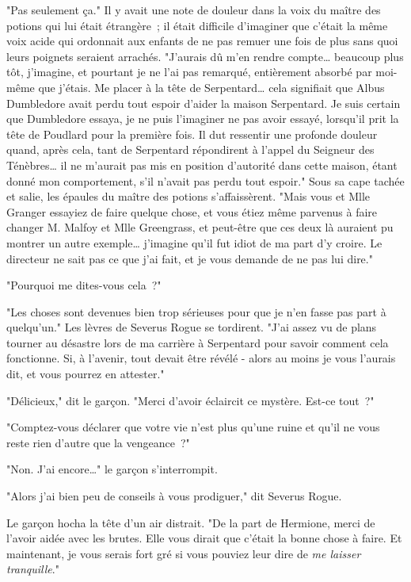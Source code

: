 "Pas seulement ça." Il y avait une note de douleur dans la voix du maître des potions qui lui était étrangère~; il était difficile d'imaginer que c'était la même voix acide qui ordonnait aux enfants de ne pas remuer une fois de plus sans quoi leurs poignets seraient arrachés. "J'aurais dû m'en rendre compte… beaucoup plus tôt, j'imagine, et pourtant je ne l'ai pas remarqué, entièrement absorbé par moi-même que j'étais. Me placer à la tête de Serpentard… cela signifiait que Albus Dumbledore avait perdu tout espoir d'aider la maison Serpentard. Je suis certain que Dumbledore essaya, je ne puis l'imaginer ne pas avoir essayé, lorsqu'il prit la tête de Poudlard pour la première fois. Il dut ressentir une profonde douleur quand, après cela, tant de Serpentard répondirent à l'appel du Seigneur des Ténèbres… il ne m'aurait pas mis en position d'autorité dans cette maison, étant donné mon comportement, s'il n'avait pas perdu tout espoir." Sous sa cape tachée et salie, les épaules du maître des potions s'affaissèrent. "Mais vous et Mlle Granger essayiez de faire quelque chose, et vous étiez même parvenus à faire changer M. Malfoy et Mlle Greengrass, et peut-être que ces deux là auraient pu montrer un autre exemple… j'imagine qu'il fut idiot de ma part d'y croire. Le directeur ne sait pas ce que j'ai fait, et je vous demande de ne pas lui dire."

"Pourquoi me dites-vous cela~?"

"Les choses sont devenues bien trop sérieuses pour que je n'en fasse pas part à quelqu'un." Les lèvres de Severus Rogue se tordirent. "J'ai assez vu de plans tourner au désastre lors de ma carrière à Serpentard pour savoir comment cela fonctionne. Si, à l'avenir, tout devait être révélé - alors au moins je vous l'aurais dit, et vous pourrez en attester."

"Délicieux," dit le garçon. "Merci d'avoir éclaircit ce mystère. Est-ce tout~?"

"Comptez-vous déclarer que votre vie n'est plus qu'une ruine et qu'il ne vous reste rien d'autre que la vengeance~?"

"Non. J'ai encore…" le garçon s'interrompit.

"Alors j'ai bien peu de conseils à vous prodiguer," dit Severus Rogue.

Le garçon hocha la tête d'un air distrait. "De la part de Hermione, merci de l'avoir aidée avec les brutes. Elle vous dirait que c'était la bonne chose à faire. Et maintenant, je vous serais fort gré si vous pouviez leur dire de \emph{me laisser tranquille}."

